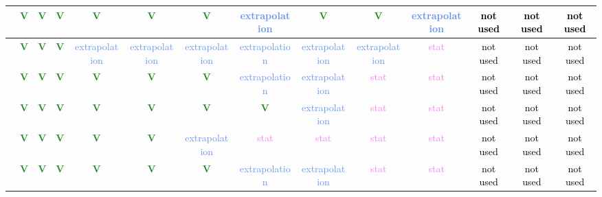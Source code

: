 \begin{frame}
{\begin{tabular}{|c||*{13}{c|}}
\hline
[226-283] & \textcolor{ForestGreen}{\textbf{V}} & \textcolor{ForestGreen}{\textbf{V}} & \textcolor{ForestGreen}{\textbf{V}} & \textcolor{ForestGreen}{\textbf{V}} & \textcolor{ForestGreen}{\textbf{V}} & \textcolor{ForestGreen}{\textbf{V}} & \textcolor{CornflowerBlue}{extrapolation} & \textcolor{ForestGreen}{\textbf{V}} & \textcolor{ForestGreen}{\textbf{V}} & \textcolor{CornflowerBlue}{extrapolation} & \textcolor{black}{not used} & \textcolor{black}{not used} & \textcolor{black}{not used} \\
\hline
[283-344] & \textcolor{ForestGreen}{\textbf{V}} & \textcolor{ForestGreen}{\textbf{V}} & \textcolor{ForestGreen}{\textbf{V}} & \textcolor{CornflowerBlue}{extrapolation} & \textcolor{CornflowerBlue}{extrapolation} & \textcolor{CornflowerBlue}{extrapolation} & \textcolor{CornflowerBlue}{extrapolation} & \textcolor{CornflowerBlue}{extrapolation} & \textcolor{CornflowerBlue}{extrapolation} & \textcolor{violet}{stat} & \textcolor{black}{not used} & \textcolor{black}{not used} & \textcolor{black}{not used} \\
\hline
[344-443] & \textcolor{ForestGreen}{\textbf{V}} & \textcolor{ForestGreen}{\textbf{V}} & \textcolor{ForestGreen}{\textbf{V}} & \textcolor{ForestGreen}{\textbf{V}} & \textcolor{ForestGreen}{\textbf{V}} & \textcolor{ForestGreen}{\textbf{V}} & \textcolor{CornflowerBlue}{extrapolation} & \textcolor{CornflowerBlue}{extrapolation} & \textcolor{violet}{stat} & \textcolor{violet}{stat} & \textcolor{black}{not used} & \textcolor{black}{not used} & \textcolor{black}{not used} \\
\hline
[443-577] & \textcolor{ForestGreen}{\textbf{V}} & \textcolor{ForestGreen}{\textbf{V}} & \textcolor{ForestGreen}{\textbf{V}} & \textcolor{ForestGreen}{\textbf{V}} & \textcolor{ForestGreen}{\textbf{V}} & \textcolor{ForestGreen}{\textbf{V}} & \textcolor{ForestGreen}{\textbf{V}} & \textcolor{CornflowerBlue}{extrapolation} & \textcolor{violet}{stat} & \textcolor{violet}{stat} & \textcolor{black}{not used} & \textcolor{black}{not used} & \textcolor{black}{not used} \\
\hline
[577-606] & \textcolor{ForestGreen}{\textbf{V}} & \textcolor{ForestGreen}{\textbf{V}} & \textcolor{ForestGreen}{\textbf{V}} & \textcolor{ForestGreen}{\textbf{V}} & \textcolor{ForestGreen}{\textbf{V}} & \textcolor{CornflowerBlue}{extrapolation} & \textcolor{violet}{stat} & \textcolor{violet}{stat} & \textcolor{violet}{stat} & \textcolor{violet}{stat} & \textcolor{black}{not used} & \textcolor{black}{not used} & \textcolor{black}{not used} \\
\hline
[606-1500] & \textcolor{ForestGreen}{\textbf{V}} & \textcolor{ForestGreen}{\textbf{V}} & \textcolor{ForestGreen}{\textbf{V}} & \textcolor{ForestGreen}{\textbf{V}} & \textcolor{ForestGreen}{\textbf{V}} & \textcolor{ForestGreen}{\textbf{V}} & \textcolor{CornflowerBlue}{extrapolation} & \textcolor{CornflowerBlue}{extrapolation} & \textcolor{violet}{stat} & \textcolor{violet}{stat} & \textcolor{black}{not used} & \textcolor{black}{not used} & \textcolor{black}{not used} \\
\hline
\end{tabular}
}
\vspace{0.5cm}


\end{frame}
